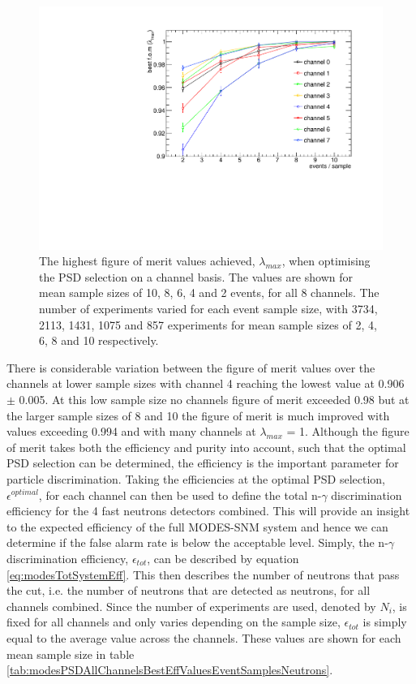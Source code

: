 \begin{figure}[htbp]
\begin{center}
\includegraphics[width=160mm]{Chapter8/figures/allChannels_bestFOM_diffEventSamples.pdf}
\caption{The highest figure of merit values achieved, $\lambda_{max}$, when optimising the PSD selection on a channel basis. The values are shown for mean sample sizes of 10, 8, 6, 4 and 2 events, for all 8 channels. The number of experiments varied for each event sample size, with 3734, 2113, 1431, 1075 and 857 experiments for mean sample sizes of 2, 4, 6, 8 and 10 respectively.}
\label{fig:modesBestFOMDiffEventSamplesAllChannels}
\end{center}
\end{figure}

There is considerable variation between the figure of merit values over the channels at lower sample sizes with channel 4 reaching the lowest value at 0.906 $\pm$ 0.005. At this low sample size no channels figure of merit exceeded 0.98 but at the larger sample sizes of 8 and 10 the figure of merit is much improved with values exceeding 0.994 and with many channels at  $\lambda_{max}$ = 1. Although the figure of merit  takes both the efficiency and purity into account, such that the optimal PSD selection can be determined, the efficiency is the important parameter for particle discrimination. Taking the efficiencies at the optimal PSD selection, $\epsilon^{optimal}$, for each channel can then be used to define the total n-$\gamma$ discrimination efficiency for the 4 fast neutrons detectors combined. This will provide an insight to the expected efficiency of the full MODES-SNM system and hence we can determine if the false alarm rate is below the acceptable level. Simply, the n-$\gamma$ discrimination efficiency, $\epsilon_{tot}$, can be described by equation \ref{eq:modesTotSystemEff}. This then describes the number of neutrons that pass the cut, i.e. the number of neutrons that are detected as neutrons, for all channels combined. Since the number of experiments are used, denoted by $N_{i}$, is fixed for all channels and only varies depending on the sample size, $\epsilon_{tot}$ is simply equal to the average value across the channels. These values are shown for each mean sample size in table \ref{tab:modesPSDAllChannelsBestEffValuesEventSamplesNeutrons}.

